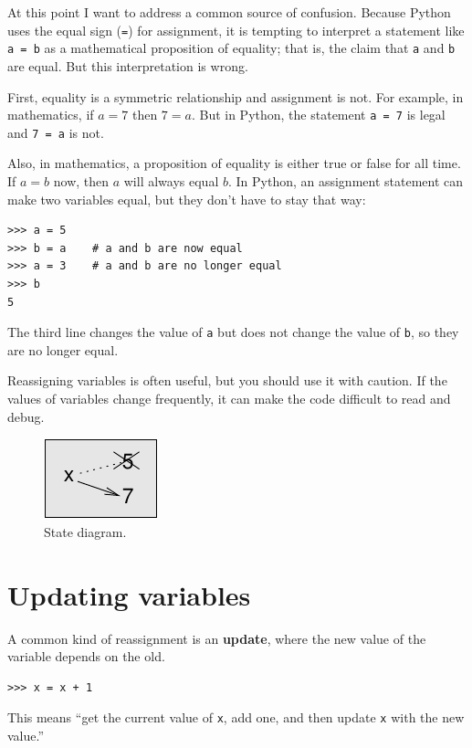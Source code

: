 \documentclass[10pt]{book}
\begin{document}
At this point I want to address a common source of
confusion.
Because Python uses the equal sign ({\tt =}) for assignment, it is
tempting to interpret a statement like {\tt a = b} as a
mathematical
proposition of equality; that is, the claim that {\tt a} and
{\tt b} are equal.  But this interpretation is wrong.

First, equality is a symmetric relationship and assignment is not.  For
example, in mathematics, if $a=7$ then $7=a$.  But in Python, the
statement {\tt a = 7} is legal and {\tt 7 = a} is not.

Also, in mathematics, a proposition of equality is either true or
false for all time.  If $a=b$ now, then $a$ will always equal $b$.
In Python, an assignment statement can make two variables equal, but
they don't have to stay that way:

\begin{verbatim}
>>> a = 5
>>> b = a    # a and b are now equal
>>> a = 3    # a and b are no longer equal
>>> b
5
\end{verbatim}
%
The third line changes the value of {\tt a} but does not change the
value of {\tt b}, so they are no longer equal. 

Reassigning variables is often useful, but you should use it
with caution.  If the values of variables change frequently, it can
make the code difficult to read and debug.

\begin{figure}
\centerline
{\includegraphics[scale=0.8]{figs/assign2.pdf}}
\caption{State diagram.}
\label{fig.assign2}
\end{figure}



\section{Updating variables}
\label{update}


A common kind of reassignment is an {\bf update},
where the new value of the variable depends on the old.

\begin{verbatim}
>>> x = x + 1
\end{verbatim}
%
This means ``get the current value of {\tt x}, add one, and then
update {\tt x} with the new value.''
\end{document}

